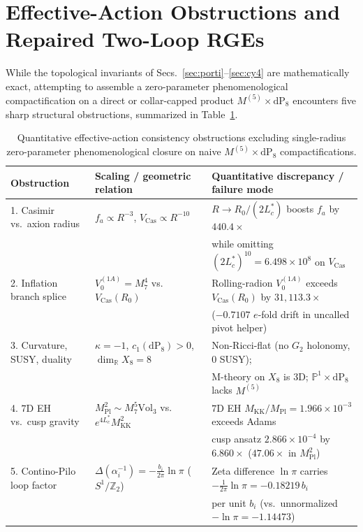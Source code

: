 \documentclass[aps,prd,twocolumn,nofootinbib,floatfix]{revtex4-2}
\begin{document}
\section{Effective-Action Obstructions and Repaired Two-Loop RGEs}
\label{sec:obstructions}

While the topological invariants of Secs.~\ref{sec:porti}--\ref{sec:cy4} are mathematically exact, attempting to assemble a zero-parameter phenomenological compactification on a direct or collar-capped product $M^{(5)} \times \mathrm{dP}_8$ encounters five sharp structural obstructions, summarized in Table~\ref{tab:obstructions}.

\begin{table}[t]
\caption{Quantitative effective-action consistency obstructions excluding single-radius zero-parameter phenomenological closure on naive $M^{(5)} \times \mathrm{dP}_8$ compactifications.}
\label{tab:obstructions}
\begin{ruledtabular}
\begin{tabular}{lll}
Obstruction & Scaling / geometric relation & Quantitative discrepancy / failure mode \\
\hline
1. Casimir vs.\ axion radius & $f_a \propto R^{-3}$, $V_{\mathrm{Cas}} \propto R^{-10}$ & $R \to R_0/(2L_c^*)$ boosts $f_a$ by $440.4\times$ \\
 & & while omitting $(2L_c^*)^{10} = 6.498\times 10^8$ on $V_{\mathrm{Cas}}$ \\
2. Inflation branch splice & $V_0^{(1A)} = M_7^4$ vs.\ $V_{\mathrm{Cas}}(R_0)$ & Rolling-radion $V_0^{(1A)}$ exceeds $V_{\mathrm{Cas}}(R_0)$ by $31{,}113.3\times$ \\
 & & ($-0.7107$ $e$-fold drift in uncalled pivot helper) \\
3. Curvature, SUSY, duality & $\kappa = -1$, $c_1(\mathrm{dP}_8) > 0$, $\dim_{\mathbb{R}} X_8 = 8$ & Non-Ricci-flat (no $G_2$ holonomy, $0$ SUSY); \\
 & & M-theory on $X_8$ is $3\mathrm{D}$; $\mathbb{P}^1\times \mathrm{dP}_8$ lacks $M^{(5)}$ \\
4. $7\mathrm{D}$ EH vs.\ cusp gravity & $M_{\mathrm{Pl}}^2 \sim M_7^5\mathrm{Vol}_3$ vs.\ $e^{4L_c^*}M_{\mathrm{KK}}^2$ & $7\mathrm{D}$ EH $M_{\mathrm{KK}}/M_{\mathrm{Pl}} = 1.966\times 10^{-3}$ exceeds Adams \\
 & & cusp ansatz $2.866\times 10^{-4}$ by $6.860\times$ ($47.06\times$ in $M_{\mathrm{Pl}}^2$) \\
5. Contino-Pilo loop factor & $\Delta(\alpha_i^{-1}) = -\frac{b_i}{2\pi}\ln\pi$ ($S^1/\mathbb{Z}_2$) & Zeta difference $\ln\pi$ carries $-\frac{1}{2\pi}\ln\pi = -0.18219\,b_i$ \\
 & & per unit $b_i$ (vs.\ unnormalized $-\ln\pi = -1.14473$) \\
\end{tabular}
\end{ruledtabular}
\end{table}
\end{document}
